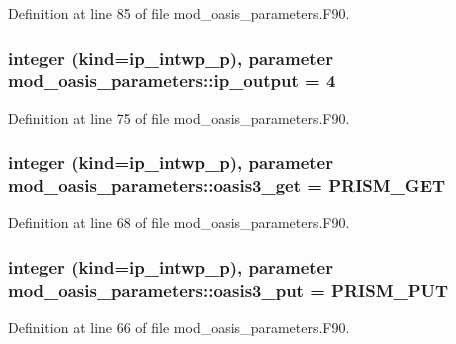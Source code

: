 Definition at line 85 of file mod\+\_\+oasis\+\_\+parameters.\+F90.

\hypertarget{classmod__oasis__parameters_a556f148d126d8d6dfe711656024436e6}{
\subsubsection[{ip\+\_\+output}]{\setlength{\rightskip}{0pt plus 5cm}integer (kind=ip\+\_\+intwp\+\_\+p), parameter mod\+\_\+oasis\+\_\+parameters\+::ip\+\_\+output = 4}}\label{classmod__oasis__parameters_a556f148d126d8d6dfe711656024436e6}


Definition at line 75 of file mod\+\_\+oasis\+\_\+parameters.\+F90.

\hypertarget{classmod__oasis__parameters_aa2ac99363b8f1aa7ff950fda3e3f5fff}{
\subsubsection[{oasis3\+\_\+get}]{\setlength{\rightskip}{0pt plus 5cm}integer (kind=ip\+\_\+intwp\+\_\+p), parameter mod\+\_\+oasis\+\_\+parameters\+::oasis3\+\_\+get = P\+R\+I\+S\+M\+\_\+\+G\+E\+T}}\label{classmod__oasis__parameters_aa2ac99363b8f1aa7ff950fda3e3f5fff}


Definition at line 68 of file mod\+\_\+oasis\+\_\+parameters.\+F90.

\hypertarget{classmod__oasis__parameters_a325334a5e2f9d0c7846c1ef964f9f7e3}{
\subsubsection[{oasis3\+\_\+put}]{\setlength{\rightskip}{0pt plus 5cm}integer (kind=ip\+\_\+intwp\+\_\+p), parameter mod\+\_\+oasis\+\_\+parameters\+::oasis3\+\_\+put = P\+R\+I\+S\+M\+\_\+\+P\+U\+T}}\label{classmod__oasis__parameters_a325334a5e2f9d0c7846c1ef964f9f7e3}


Definition at line 66 of file mod\+\_\+oasis\+\_\+parameters.\+F90.

